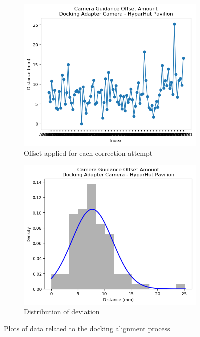 \begin{figure}[!h]
    \centering
    \begin{subfigure}[b]{0.49\textwidth}
        \centering
        \includegraphics[width=\textwidth]{images/7b/img43.png}
        \caption{Offset applied for each correction attempt}
        \label{fig:offset-applied-for-each-correction-attempt}
    \end{subfigure}
    \hfill
    \begin{subfigure}[b]{0.49\textwidth}
        \centering
        \includegraphics[width=\textwidth]{images/7b/img44.png}
        \caption{Distribution of deviation}
        \label{fig:distribution-of-deviation}
    \end{subfigure}
    \caption{Plots of data related to the docking alignment process}
\end{figure}

